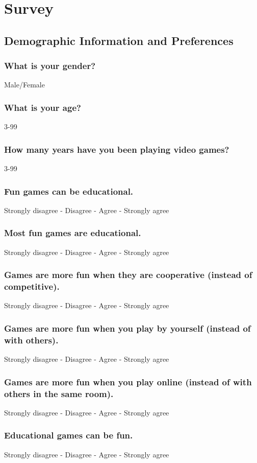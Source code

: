 \newpage
\section{Survey}
	
	\subsection{Demographic Information and Preferences}
		\subsubsection{What is your gender?} Male/Female
		\subsubsection{What is your age?} 3-99
		\subsubsection{How many years have you been playing video games?} 3-99
		\subsubsection{Fun games can be educational.} Strongly disagree - Disagree - Agree - Strongly agree
		\subsubsection{Most fun games are educational.} Strongly disagree - Disagree - Agree - Strongly agree
		\subsubsection{Games are more fun when they are cooperative (instead of competitive).} Strongly disagree - Disagree - Agree - Strongly agree
		\subsubsection{Games are more fun when you play by yourself (instead of with others).} Strongly disagree - Disagree - Agree - Strongly agree
		\subsubsection{Games are more fun when you play online (instead of with others in the same room).} Strongly disagree - Disagree - Agree - Strongly agree
		\subsubsection{Educational games can be fun.} Strongly disagree - Disagree - Agree - Strongly agree
